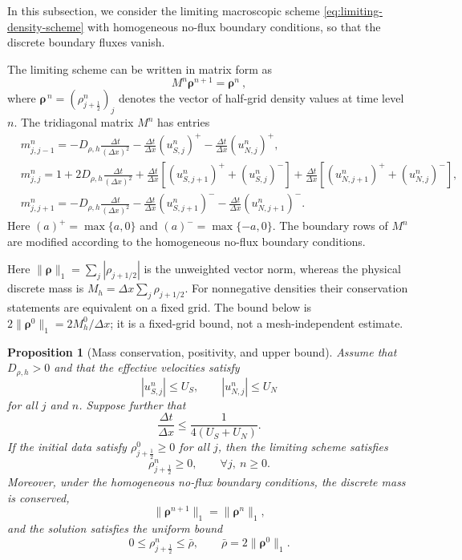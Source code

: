 \documentclass[11pt,twoside]{article}
\numberwithin{equation}{section}
\theoremstyle{plain}
\newtheorem{proposition}[theorem]{Proposition}
\theoremstyle{nonumberplain}
\newcommand{\brho}{\boldsymbol{\rho}}
\newif\ifrevisionred
\DeclareRobustCommand{\st}[1]{{\ifrevisionred\color{red}\fi #1}}
\begin{document}
{In this subsection, we consider the limiting macroscopic scheme \eqref{eq:limiting-density-scheme} with
homogeneous no-flux boundary conditions, so that the discrete boundary
fluxes vanish.


The limiting scheme can be written in matrix form as
\[
M^n\brho^{n+1}=\brho^n \ ,
\]
where
 $\boldsymbol{\rho}^{\,n}
=
(\rho_{j+\frac12}^n)_j$
denotes the vector of half-grid density values at time level $n$.
The tridiagonal matrix $M^n$ has entries
\begin{align*}
&m_{j,j-1}^n
=
-D_{\rho,h}\frac{\Delta t}{(\Delta x)^2}
-\frac{\Delta t}{\Delta x}(u_{S,j}^n)^+
-\frac{\Delta t}{\Delta x}(u_{N,j}^n)^+,\\
&m_{j,j}^n
=
1+2D_{\rho,h}\frac{\Delta t}{(\Delta x)^2}
+\frac{\Delta t}{\Delta x}
\left[(u_{S,j+1}^n)^+ +(u_{S,j}^n)^-\right]
+\frac{\Delta t}{\Delta x}
\left[(u_{N,j+1}^n)^+ +(u_{N,j}^n)^-\right],\\
&m_{j,j+1}^n
=
-D_{\rho,h}\frac{\Delta t}{(\Delta x)^2}
-\frac{\Delta t}{\Delta x}(u_{S,j+1}^n)^-
-\frac{\Delta t}{\Delta x}(u_{N,j+1}^n)^- .
\end{align*}
Here $(a)^+=\max\{a,0\}$ and $(a)^-=\max\{-a,0\}$.
The boundary rows of \(M^n\) are modified according to the homogeneous
no-flux boundary conditions.


\st{Here $\|\brho\|_1=\sum_j|\rho_{j+1/2}|$ is the unweighted vector norm, whereas the physical discrete mass is $M_h=\Delta x\sum_j\rho_{j+1/2}$. For nonnegative densities their conservation statements are equivalent on a fixed grid. The bound below is $2\|\brho^0\|_1=2M_h^0/\Delta x$; it is a fixed-grid bound, not a mesh-independent estimate.}

\begin{proposition}[Mass conservation, positivity, and upper bound]
Assume that $D_{\rho,h}>0$ and that the effective velocities satisfy
\[
|u_{S,j}^n|\le U_S,\qquad |u_{N,j}^n|\le U_N
\]
for all $j$ and $n$. Suppose further that
\begin{equation}\label{eq:CFL-bound-new}
\frac{\Delta t}{\Delta x}
\le
\frac{1}{4(U_S+U_N)} .
\end{equation}
If the initial data satisfy $\rho_{j+\frac12}^0\ge0$ for all $j$, then the
limiting scheme satisfies
\[
\rho_{j+\frac12}^n\ge0,\qquad \forall j,\ n\ge0.
\]
Moreover, under the homogeneous no-flux boundary conditions, the discrete
mass is conserved,
\[
\|\brho^{n+1}\|_1=\|\brho^n\|_1,
\]
and the solution satisfies the uniform bound
\[
0\le \rho_{j+\frac12}^n\le \bar\rho,\qquad
\bar\rho=2\|\brho^0\|_1 .
\]
\end{proposition}

}
\end{document}
